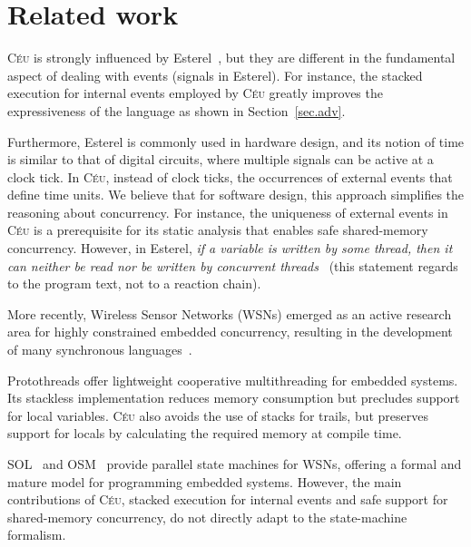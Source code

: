 \documentclass[preprint]{sigplanconf}
\newcommand{\CEU}{\textsc{C\'{e}u}\xspace}
\newcommand{\1}{\;}
\newcommand{\2}{\;\;}
\newcommand{\3}{\;\;\;}
\newcommand{\5}{\;\;\;\;\;}
\begin{document}


\section{Related work}
\label{sec.related}

\CEU is strongly influenced by Esterel~\cite{esterel.ieee91}, but they are 
different in the fundamental aspect of dealing with events (signals in 
Esterel).
For instance, the stacked execution for internal events employed by \CEU 
greatly improves the expressiveness of the language as shown in 
Section~\ref{sec.adv}.

Furthermore, Esterel is commonly used in hardware design, and its notion of 
time is similar to that of digital circuits, where multiple signals can be 
active at a clock tick.
In \CEU, instead of clock ticks, the occurrences of external events that define 
time units.
We believe that for software design, this approach simplifies the reasoning 
about concurrency.
For instance, the uniqueness of external events in \CEU is a prerequisite for 
its static analysis that enables safe shared-memory concurrency.
However, in Esterel, \emph{if a variable is written by some thread, then it can 
neither be read nor be written by concurrent threads}~\cite{esterel.primer} 
(this statement regards to the program text, not to a reaction chain).

More recently, Wireless Sensor Networks (WSNs) emerged as an active research 
area for highly constrained embedded concurrency, resulting in the development 
of many synchronous languages~\cite{wsn.protothreads,wsn.sol,wsn.osm}.

Protothreads \cite{wsn.protothreads} offer lightweight cooperative 
multithreading for embedded systems.
Its stackless implementation reduces memory consumption but precludes support 
for local variables.
\CEU also avoids the use of stacks for trails, but preserves support for locals 
by calculating the required memory at compile time.

SOL~\cite{wsn.sol} and OSM~\cite{wsn.osm} provide parallel state machines for 
WSNs, offering a formal and mature model for programming embedded systems.
However, the main contributions of \CEU, stacked execution for internal 
events and safe support for shared-memory concurrency, do not directly adapt to 
the state-machine formalism.
\end{document}
